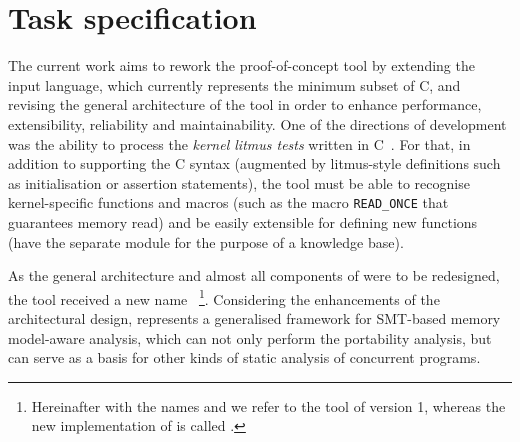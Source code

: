 

\section{Task specification}
\label{ch:intro:task}

The current work aims to rework the proof-of-concept tool \textit{\porthos{}} by extending the input language, which currently represents the minimum subset of C, and revising the general architecture of the tool in order to enhance performance, extensibility, reliability and maintainability.
One of the directions of development was the ability to process the \textit{kernel litmus tests} written in C~\cite{mckenney2017wg21}.
For that, in addition to supporting the C syntax (augmented by litmus-style definitions such as initialisation or assertion statements), the tool must be able to recognise kernel-specific functions and macros (such as the macro \texttt{READ\_ONCE} that guarantees memory read) and be easily extensible for defining new functions (have the separate module for the purpose of a knowledge base).

As the general architecture and almost all components of \porthos{} were to be redesigned, the tool received a new name \textit{\porthos[2]}\,%
%
\footnote{Hereinafter with the names \textit{\porthos{}} and \textit{\porthos[1]} we refer to the tool \porthos{} of version 1, whereas the new implementation of \porthos{} is called \textit{\porthos[2]}.}. %
%
Considering the enhancements of the architectural design, \porthos[2] represents a generalised framework for SMT-based memory model-aware analysis, which can not only perform the portability analysis, but can serve as a basis for other kinds of static analysis of concurrent programs.


